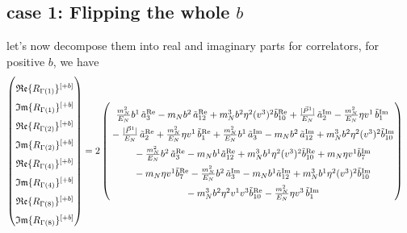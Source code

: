 \documentclass[]{article}
\numberwithin{equation}{section}
\newcommand{\bvec}{b}
\newcommand{\mN}{m_N}
\begin{document}
\subsection{case 1: Flipping the whole $\bvec$}
let's now decompose them into real and imaginary parts for correlators, for positive $b$, we have 
\begin{align}
    \begin{pmatrix}
        \rule{0pt}{16pt} \mathfrak{Re}\{ R_{\Gamma(1)}\}^{[+b]} \\
        \rule{0pt}{16pt} \mathfrak{Im}\{ R_{\Gamma(1)}\}^{[+b]} \\
        \rule{0pt}{16pt} \mathfrak{Re}\{ R_{\Gamma(2)}\}^{[+b]} \\
        \rule{0pt}{16pt} \mathfrak{Im}\{ R_{\Gamma(2)}\}^{[+b]} \\
        \rule{0pt}{16pt} \mathfrak{Re}\{ R_{\Gamma(4)}\}^{[+b]} \\
        \rule{0pt}{16pt} \mathfrak{Im}\{ R_{\Gamma(4)}\}^{[+b]} \\
        \rule{0pt}{16pt} \mathfrak{Re}\{ R_{\Gamma(8)}\}^{[+b]} \\
        \rule{0pt}{16pt} \mathfrak{Im}\{ R_{\Gamma(8)}\}^{[+b]}
    \end{pmatrix} &= 2\begin{pmatrix}
     \rule{0pt}{16pt}   \frac{\mN^2}{E_N} \bvec^1\, \tilde a^{\text{Re}}_3-  \mN  \bvec^2 \, \tilde a^{\text{Re}}_{12}+  \mN^3  \bvec^2 \eta^2 (v^3)^2 \tilde b^{\text{Re}}_{10} +\frac{|\vec{P}^1|}{E_N}\, \tilde a^{\text{Im}}_2- \frac{\mN^2}{E_N} \eta v^1\, \tilde b^{\text{Im}}_1\\
      \rule{0pt}{16pt}  -\frac{|\vec{P}^1|}{E_N}\, \tilde a^{\text{Re}}_2+ \frac{\mN^2}{E_N} \eta v^1\, \tilde b^{\text{Re}}_1 + \frac{\mN^2}{E_N} \bvec^1\, \tilde a^{\text{Im}}_3-  \mN  \bvec^2 \, \tilde a^{\text{Im}}_{12}+  \mN^3  \bvec^2 \eta^2 (v^3)^2 \tilde b^{\text{Im}}_{10}\\
      \rule{0pt}{16pt}  -  \frac{\mN^2}{E_N} \bvec^2\, \tilde a^{\text{Re}}_3
		-  \mN   \bvec^1  \tilde a^{\text{Re}}_{12}+ \mN^3  \bvec^1 \eta^2 (v^3)^2 \tilde b^{\text{Re}}_{10}+\mN \eta v^1  \tilde b^{\text{Im}}_7 \\
      \rule{0pt}{16pt} - \mN \eta v^1  \tilde b^{\text{Re}}_7 -  \frac{\mN^2}{E_N} \bvec^2\, \tilde a^{\text{Im}}_3
		-  \mN   \bvec^1  \tilde a^{\text{Im}}_{12}+ \mN^3  \bvec^1 \eta^2 (v^3)^2 \tilde b^{\text{Im}}_{10}\\
      \rule{0pt}{16pt} -\mN^3 \bvec^2 \eta^2 v^1 v^3\tilde b^{\text{Re}}_{10}-\frac{\mN^2}{E_N} \eta v^3\, \tilde b^{\text{Im}}_1\\

\end{pmatrix}
\end{align}
\end{document}
